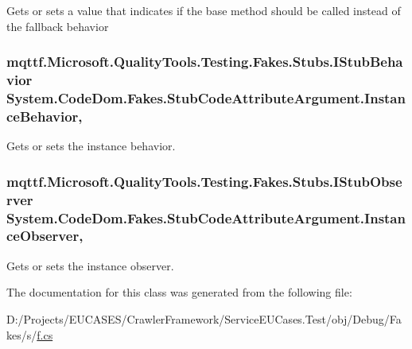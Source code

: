 Gets or sets a value that indicates if the base method should be called instead of the fallback behavior

\hypertarget{class_system_1_1_code_dom_1_1_fakes_1_1_stub_code_attribute_argument_a8b26cfdddd2cd77f0122d7607288c219}{
\subsubsection[{Instance\-Behavior}]{\setlength{\rightskip}{0pt plus 5cm}mqttf.\-Microsoft.\-Quality\-Tools.\-Testing.\-Fakes.\-Stubs.\-I\-Stub\-Behavior System.\-Code\-Dom.\-Fakes.\-Stub\-Code\-Attribute\-Argument.\-Instance\-Behavior\hspace{0.3cm}{\ttfamily [get]}, {\ttfamily [set]}}}\label{class_system_1_1_code_dom_1_1_fakes_1_1_stub_code_attribute_argument_a8b26cfdddd2cd77f0122d7607288c219}


Gets or sets the instance behavior.

\hypertarget{class_system_1_1_code_dom_1_1_fakes_1_1_stub_code_attribute_argument_ad6f67658626aa3e2efab8629cf62abb5}{
\subsubsection[{Instance\-Observer}]{\setlength{\rightskip}{0pt plus 5cm}mqttf.\-Microsoft.\-Quality\-Tools.\-Testing.\-Fakes.\-Stubs.\-I\-Stub\-Observer System.\-Code\-Dom.\-Fakes.\-Stub\-Code\-Attribute\-Argument.\-Instance\-Observer\hspace{0.3cm}{\ttfamily [get]}, {\ttfamily [set]}}}\label{class_system_1_1_code_dom_1_1_fakes_1_1_stub_code_attribute_argument_ad6f67658626aa3e2efab8629cf62abb5}


Gets or sets the instance observer.



The documentation for this class was generated from the following file\-:\begin{DoxyCompactItemize}
\item 
D\-:/\-Projects/\-E\-U\-C\-A\-S\-E\-S/\-Crawler\-Framework/\-Service\-E\-U\-Cases.\-Test/obj/\-Debug/\-Fakes/s/\hyperlink{s_2f_8cs}{f.\-cs}\end{DoxyCompactItemize}
